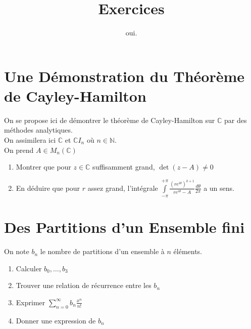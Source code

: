 \documentclass[12pt,a4paper]{article}
\title{Exercices}
\author{oui.}
\begin{document}
\maketitle
\tableofcontents
\section{Une Démonstration du Théorème de Cayley-Hamilton}\label{sec:cayley-analytique}
On se propose ici de démontrer le théorème de Cayley-Hamilton sur $\mathbb{C}$ par des méthodes analytiques.\\
On assimilera ici $\mathbb{C}$ et $\mathbb{C}I_{n}$ où $n \in \mathbb{N}$.\\
On prend $A \in M_{n}(\mathbb{C})$
\begin{enumerate}
    \item Montrer que pour $z \in \mathbb{C}$ suffisamment grand, $\det(z - A) \neq 0 $
    \item En déduire que pour $r$ assez grand, l'intégrale $\int\limits_{-\pi}^{+\pi}\frac{(re^{i\theta})^{k+1}}{re^{i\theta} - A}\frac{d\theta}{2\pi}$ a un sens.
\end{enumerate}

\section{Des Partitions d'un Ensemble fini}
On note $b_{n}$ le nombre de partitions d'un ensemble à $n$ éléments.
\begin{enumerate}
    \item Calculer $b_{0}, \dots, b_{3}$
    \item Trouver une relation de récurrence entre les $b_{n}$
    \item Exprimer $\sum\limits_{n=0}^{\infty}b_{n}\frac{x^{n}}{n!}$
    \item Donner une expression de $b_{n}$
\end{enumerate}
\end{document}
